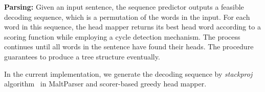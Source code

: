 {\bf Parsing:} Given an input sentence, the sequence predictor
outputs a feasible decoding sequence, which is a permutation of
the words in the input. For each word in this sequence,
the head mapper returns its best head word according to a scoring function
while employing a cycle detection mechanism.
The process continues until all words in the sentence have found their
heads.
The procedure guarantees to produce a tree structure eventually.

In the current implementation, we generate the decoding sequence by
{\em stackproj} algorithm~\cite{nivre2009non} in
MaltParser and scorer-based greedy head mapper.

